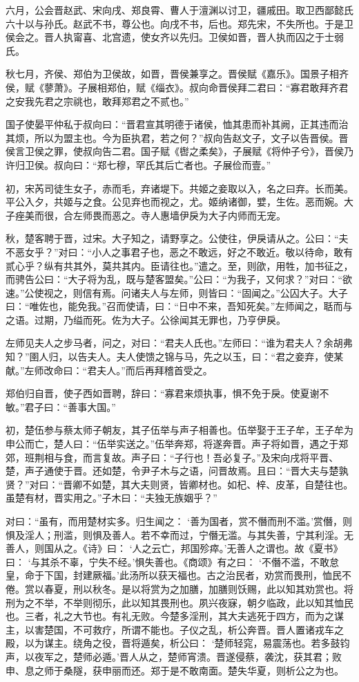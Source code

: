 \documentclass[a4paper,12pt,UTF8,twoside]{ctexbook}
\begin{document}
六月，公会晋赵武、宋向戌、郑良霄、曹人于澶渊以讨卫，疆戚田。取卫西鄙懿氏六十以与孙氏。赵武不书，尊公也。向戌不书，后也。郑先宋，不失所也。于是卫侯会之。晋人执甯喜、北宫遗，使女齐以先归。卫侯如晋，晋人执而囚之于士弱氏。

秋七月，齐侯、郑伯为卫侯故，如晋，晋侯兼享之。晋侯赋《嘉乐》。国景子相齐侯，赋《蓼萧》。子展相郑伯，赋《缁衣》。叔向命晋侯拜二君曰：“寡君敢拜齐君之安我先君之宗祧也，敢拜郑君之不贰也。”

国子使晏平仲私于叔向曰：“晋君宣其明德于诸侯，恤其患而补其阙，正其违而治其烦，所以为盟主也。今为臣执君，若之何？”叔向告赵文子，文子以告晋侯。晋侯言卫侯之罪，使叔向告二君。国子赋《辔之柔矣》，子展赋《将仲子兮》，晋侯乃许归卫侯。叔向曰：“郑七穆，罕氏其后亡者也。子展俭而壹。”

初，宋芮司徒生女子，赤而毛，弃诸堤下。共姬之妾取以入，名之曰弃。长而美。平公入夕，共姬与之食。公见弃也而视之，尤。姬纳诸御，嬖，生佐。恶而婉。大子痤美而很，合左师畏而恶之。寺人惠墙伊戾为大子内师而无宠。

秋，楚客聘于晋，过宋。大子知之，请野享之。公使往，伊戾请从之。公曰：“夫不恶女乎？”对曰：“小人之事君子也，恶之不敢远，好之不敢近。敬以待命，敢有贰心乎？纵有共其外，莫共其内。臣请往也。”遣之。至，则欿，用牲，加书征之，而骋告公曰：“大子将为乱，既与楚客盟矣。”公曰：“为我子，又何求？”对曰：“欲速。”公使视之，则信有焉。问诸夫人与左师，则皆曰：“固闻之。”公囚大子。大子曰：“唯佐也，能免我。”召而使请，曰：“日中不来，吾知死矣。”左师闻之，聒而与之语。过期，乃缢而死。佐为大子。公徐闻其无罪也，乃亨伊戾。

左师见夫人之步马者，问之，对曰：“君夫人氏也。”左师曰：“谁为君夫人？余胡弗知？”圉人归，以告夫人。夫人使馈之锦与马，先之以玉，曰：“君之妾弃，使某献。”左师改命曰：“君夫人。”而后再拜稽首受之。

郑伯归自晋，使子西如晋聘，辞曰：“寡君来烦执事，惧不免于戾。使夏谢不敏。”君子曰：“善事大国。”

初，楚伍参与蔡太师子朝友，其子伍举与声子相善也。伍举娶于王子牟，王子牟为申公而亡，楚人曰：“伍举实送之。”伍举奔郑，将遂奔晋。声子将如晋，遇之于郑郊，班荆相与食，而言复故。声子曰：“子行也！吾必复子。”及宋向戌将平晋、楚，声子通使于晋。还如楚，令尹子木与之语，问晋故焉。且曰：“晋大夫与楚孰贤？”对曰：“晋卿不如楚，其大夫则贤，皆卿材也。如杞、梓、皮革，自楚往也。虽楚有材，晋实用之。”子木曰：“夫独无族姻乎？”

对曰：“虽有，而用楚材实多。归生闻之： ‘善为国者，赏不僭而刑不滥。’赏僭，则惧及淫人；刑滥，则惧及善人。若不幸而过，宁僭无滥。与其失善，宁其利淫。无善人，则国从之。《诗》曰： ‘人之云亡，邦国殄瘁。’无善人之谓也。故《夏书》曰： ‘与其杀不辜，宁失不经。’惧失善也。《商颂》有之曰： ‘不僭不滥，不敢怠皇，命于下国，封建厥福。’此汤所以获天福也。古之治民者，劝赏而畏刑，恤民不倦。赏以春夏，刑以秋冬。是以将赏为之加膳，加膳则饫赐，此以知其劝赏也。将刑为之不举，不举则彻乐，此以知其畏刑也。夙兴夜寐，朝夕临政，此以知其恤民也。三者，礼之大节也。有礼无败。今楚多淫刑，其大夫逃死于四方，而为之谋主，以害楚国，不可救疗，所谓不能也。子仪之乱，析公奔晋。晋人置诸戎车之殿，以为谋主。绕角之役，晋将遁矣，析公曰： ‘楚师轻窕，易震荡也。若多鼓钧声，以夜军之，楚师必遁。’晋人从之，楚师宵溃。晋遂侵蔡，袭沈，获其君；败申、息之师于桑隧，获申丽而还。郑于是不敢南面。楚失华夏，则析公之为也。
\end{document}
